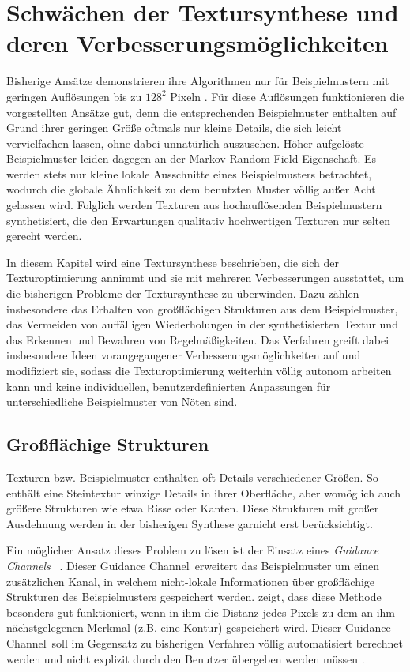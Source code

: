 \section{Schwächen der Textursynthese und deren Verbesserungsmöglichkeiten}

Bisherige Ansätze demonstrieren ihre Algorithmen nur für Beispielmustern mit geringen Auflösungen bis zu $128^2$ Pixeln \cite{SelfTuning}.
Für diese Auflösungen funktionieren die vorgestellten Ansätze gut, denn die entsprechenden Beispielmuster enthalten auf Grund ihrer geringen Größe oftmals nur kleine Details, die sich leicht vervielfachen lassen, ohne dabei unnatürlich auszusehen.
Höher aufgelöste Beispielmuster leiden dagegen an der \glqq Markov Random Field\grqq -Eigenschaft.
Es werden stets nur kleine lokale Ausschnitte eines Beispielmusters betrachtet, wodurch die globale Ähnlichkeit zu dem benutzten Muster völlig außer Acht gelassen wird.
Folglich werden Texturen aus hochauflösenden Beispielmustern synthetisiert, die den Erwartungen qualitativ hochwertigen Texturen nur selten gerecht werden.

In diesem Kapitel wird eine Textursynthese beschrieben, die sich der Texturoptimierung annimmt und sie mit mehreren Verbesserungen ausstattet, um die bisherigen Probleme der Textursynthese zu überwinden.
Dazu zählen insbesondere das Erhalten von großflächigen Strukturen aus dem Beispielmuster, das Vermeiden von auffälligen Wiederholungen in der synthetisierten Textur und das Erkennen und Bewahren von Regelmäßigkeiten.
Das Verfahren greift dabei insbesondere Ideen vorangegangener Verbesserungsmöglichkeiten auf und modifiziert sie, sodass die Texturoptimierung weiterhin völlig autonom arbeiten kann und keine individuellen, benutzerdefinierten Anpassungen für unterschiedliche Beispielmuster von Nöten sind.

\subsection{Großflächige Strukturen}

Texturen bzw. Beispielmuster enthalten oft Details verschiedener Größen.
So enthält eine Steintextur winzige Details in ihrer Oberfläche, aber womöglich auch größere Strukturen wie etwa Risse oder Kanten.
Diese Strukturen mit großer Ausdehnung werden in der bisherigen Synthese garnicht erst berücksichtigt.

Ein möglicher Ansatz dieses Problem zu lösen ist der Einsatz eines \emph{\glqq Guidance Channels\grqq} \ \cite{SelfTuning}.
Dieser \glqq Guidance Channel\grqq \ erweitert das Beispielmuster um einen zusätzlichen Kanal, in welchem nicht-lokale Informationen über großflächige Strukturen des Beispielmusters gespeichert werden.
\cite{Guidance} zeigt, dass diese Methode besonders gut funktioniert, wenn in ihm die Distanz jedes Pixels zu dem an ihm nächstgelegenen Merkmal (z.B. eine Kontur)  gespeichert wird.
Dieser \glqq Guidance Channel\grqq \ soll im Gegensatz zu bisherigen Verfahren völlig automatisiert berechnet werden und nicht explizit durch den Benutzer übergeben werden müssen \cite{SelfTuning}.


